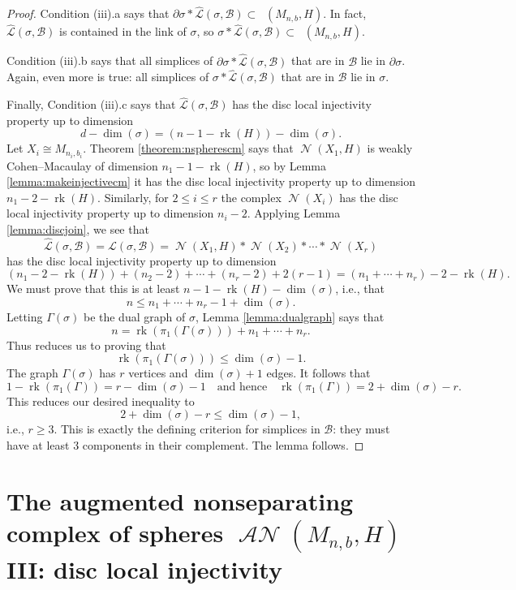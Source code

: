 \documentclass[11pt]{amsart}
\numberwithin{equation}{section}
\theoremstyle{plain}
\theoremstyle{definition}
\theoremstyle{remark}
\DeclareMathOperator{\rank}{rk}
\newcommand\cB{\ensuremath{\mathcal{B}}}
\newcommand\cL{\ensuremath{\mathcal{L}}}
\newcommand\hcL{\ensuremath{\widehat{\cL}}}
\DeclareMathOperator{\Spheres}{\mathcal{S}}
\DeclareMathOperator{\SpheresNS}{\Spheres_{\text{ns}}}
\DeclareMathOperator{\NSpheres}{\mathcal{N}}
\DeclareMathOperator{\ANSpheres}{\mathcal{AN}}
\begin{document}
\begin{proof}
Condition (iii).a says that 
$\partial \sigma \ast \hcL(\sigma,\cB) \subset \SpheresNS(M_{n,b},H)$.  In fact, $\hcL(\sigma,\cB)$
is contained in the link of $\sigma$, so $\sigma \ast \hcL(\sigma,\cB) \subset \SpheresNS(M_{n,b},H)$.

Condition (iii).b says that all simplices of $\partial \sigma \ast \hcL(\sigma,\cB)$ that are in $\cB$
lie in $\partial \sigma$.  Again, even more is true: all simplices of $\sigma \ast \hcL(\sigma,\cB)$ that
are in $\cB$ lie in $\sigma$.

Finally, Condition (iii).c says that $\hcL(\sigma,\cB)$ has the disc local injectivity
property up to dimension
\[d - \dim(\sigma) = (n-1-\rank(H)) - \dim(\sigma).\]
Let $X_i \cong M_{n_i,b_i}$.  Theorem \ref{theorem:nspherescm} says that $\NSpheres(X_1,H)$
is weakly Cohen--Macaulay of dimension $n_1-1-\rank(H)$, so by Lemma \ref{lemma:makeinjectivecm}
it has the disc local injectivity property up to dimension $n_1-2-\rank(H)$.  Similarly,
for $2 \leq i \leq r$ the complex $\NSpheres(X_i)$ has the disc local injectivity property
up to dimension $n_i-2$.  Applying Lemma \ref{lemma:discjoin}, we see that
\[\hcL(\sigma,\cB) = \cL(\sigma,\cB) = \NSpheres(X_1,H) \ast \NSpheres(X_2) \ast \cdots \ast \NSpheres(X_r)\]
has the disc local injectivity property up to dimension
\[(n_1-2-\rank(H)) + (n_2-2) + \cdots + (n_r-2) + 2(r-1) = (n_1+\cdots+n_r) - 2 - \rank(H).\]
We must prove that this is at least $n-1-\rank(H) - \dim(\sigma)$, i.e., that
\[n \leq n_1 + \cdots + n_r - 1 + \dim(\sigma).\]
Letting $\Gamma(\sigma)$ be the dual graph of $\sigma$, Lemma \ref{lemma:dualgraph} says that
\[n = \rank(\pi_1(\Gamma(\sigma))) + n_1 + \cdots + n_r.\]
Thus reduces us to proving that
\[\rank(\pi_1(\Gamma(\sigma))) \leq \dim(\sigma) - 1.\]
The graph $\Gamma(\sigma)$ has $r$ vertices and $\dim(\sigma)+1$ edges.  It follows that
\[1-\rank(\pi_1(\Gamma)) = r - \dim(\sigma) - 1 \quad \text{and hence} \quad \rank(\pi_1(\Gamma)) = 2+\dim(\sigma)-r.\]
This reduces our desired inequality to
\[2 + \dim(\sigma) - r \leq \dim(\sigma) - 1,\]
i.e., $r \geq 3$.  This is exactly the defining criterion for simplices in $\cB$: they must have at least $3$
components in their complement.  The lemma follows.
\end{proof}

\section{The augmented nonseparating complex of spheres \texorpdfstring{$\ANSpheres(M_{n,b},H)$}{AN(M,H)} III: disc local injectivity}
\label{section:augmenteddisc}
\end{document}
